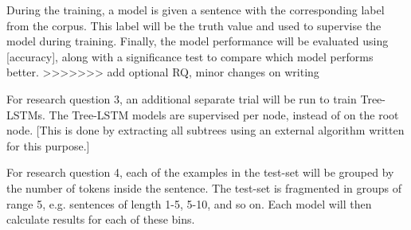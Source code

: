 During the training, a model is given a sentence with the corresponding label
from the corpus. This label will be the truth value and used to supervise the
model during training. Finally, the model performance will be evaluated using
[accuracy], along with a significance test to compare which model performs
better.
>>>>>>> add optional RQ, minor changes on writing

For research question 3, an additional separate trial will be run to train
Tree-LSTMs. The Tree-LSTM models are supervised per node, instead of on the root
node. [This is done by extracting all subtrees using an external algorithm
written for this purpose.]

For research question 4, each of the examples in the test-set will be grouped by
the number of tokens inside the sentence. The test-set is fragmented in groups
of range 5, e.g. sentences of length 1-5, 5-10, and so on. Each model will then
calculate results for each of these bins.


